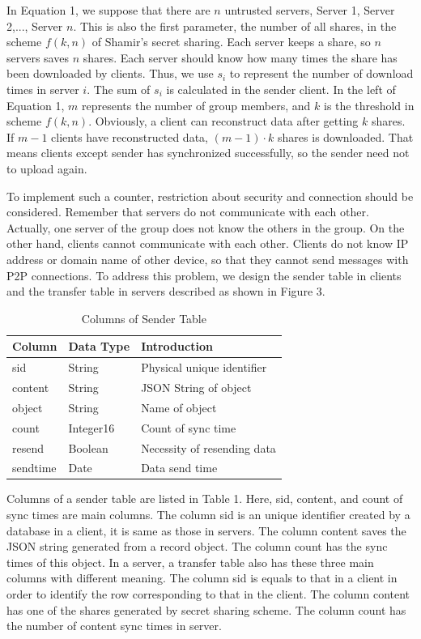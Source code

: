\documentclass[twocolumn,10pt]{article}
\begin{document}
In Equation 1, we suppose that there are $n$ untrusted servers, Server 1, Server 2,..., Server $n$. This is also the first parameter, the number of all shares, in the scheme $f(k, n)$ of Shamir's secret sharing. Each server keeps a share, so $n$ servers saves $n$ shares. Each server should know how many times the share has been downloaded by clients. Thus, we use $s_i$ to represent the number of download times in server $i$. The sum of $s_i$ is calculated in the sender client. In the left of Equation 1, $m$ represents the number of group members, and $k$ is the threshold in scheme $f(k, n)$. Obviously, a client can reconstruct data after getting $k$ shares. If $m-1$ clients have reconstructed data, $(m-1)\cdot k$ shares is downloaded. That means clients except sender has synchronized successfully, so the sender need not to upload again.

To implement such a counter, restriction about security and connection should be considered. Remember that servers do not communicate with each other. Actually, one server of the group does not know the others in the group. On the other hand, clients cannot communicate with each other. Clients do not know IP address or domain name of other device, so that they cannot send messages with P2P connections. To address this problem, we design the sender table in clients and the transfer table in servers described as shown in Figure 3. 

\begin{table}[tbp]
	\centering  
	\begin{tabular}{lll}  
		\hline
		Column &Data Type & Introduction\\ 
		\hline  
		sid &String & Physical unique identifier\\
		content & String & JSON String of object\\ 
		object & String & Name of object\\
		count & Integer16 & Count of sync time\\
		resend & Boolean &Necessity of resending data \\
		sendtime & Date & Data send time\\
		\hline
	\end{tabular}
	\caption{Columns of Sender Table}
\end{table}

Columns of a sender table are listed in Table 1. Here, sid, content, and count of sync times are main columns. The column  sid is an unique identifier created by a database in a client, it is same as those in servers. The column content saves the JSON string generated from a record object. The column count has the sync times of this object. In a server, a transfer table also has these three main columns with different meaning. The column sid is equals to that in a client in order to identify the row corresponding to that in the client. The column content has one of the shares generated by secret sharing scheme. The column count has the number of content sync times in server.
\end{document}
